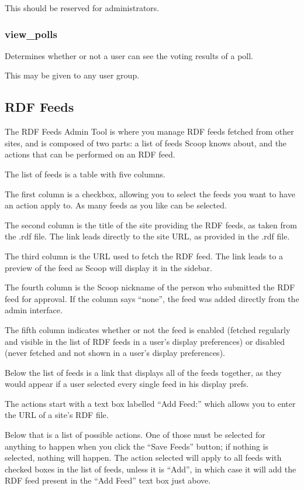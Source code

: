 This should be reserved for administrators.

\subsubsection{view\_polls}
\label{perm-view-polls}

Determines whether or not a user can see the voting results of a poll.

This may be given to any user group.



\subsection{RDF Feeds}
\label{admin-tools-rdf}

The RDF Feeds Admin Tool is where you manage RDF feeds fetched from other sites, and is composed of two parts: a list of feeds Scoop knows about, and the actions that can be performed on an RDF feed.

The list of feeds is a table with five columns.

The first column is a checkbox, allowing you to select the feeds you want to have an action apply to.  As many feeds as you like can be selected.

The second column is the title of the site providing the RDF feeds, as taken from the .rdf file.  The link leads directly to the site URL, as provided in the .rdf file.

The third column is the URL used to fetch the RDF feed.  The link leads to a preview of the feed as Scoop will display it in the sidebar.

The fourth column is the Scoop nickname of the person who submitted the RDF feed for approval.  If the column says ``none'', the feed was added directly from the admin interface.

The fifth column indicates whether or not the feed is enabled (fetched regularly and visible in the list of RDF feeds in a user's display preferences) or disabled (never fetched and not shown in a user's display preferences).

Below the list of feeds is a link that displays all of the feeds together, as they would appear if a user selected every single feed in his display prefs.  

The actions start with a text box labelled ``Add Feed:'' which allows you to enter the URL of a site's RDF file.

Below that is a list of possible actions.  One of those must be selected for anything to happen when you click the ``Save Feeds'' button; if nothing is selected, nothing will happen.  The action selected will apply to all feeds with checked boxes in the list of feeds, unless it is ``Add'', in which case it will add the RDF feed present in the ``Add Feed'' text box just above.

